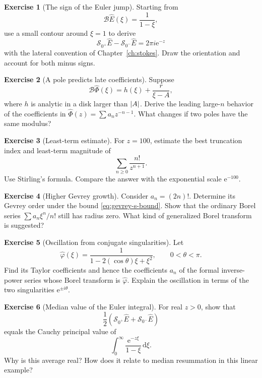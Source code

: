 \documentclass[11pt,oneside]{book}
\theoremstyle{definition}
\newtheorem{exercise}{Exercise}[chapter]
\theoremstyle{remark}
\newcommand{\Borel}{\mathcal{B}}
\newcommand{\e}{\mathrm{e}}
\newcommand{\dd}{\,\mathrm{d}}
\newcommand{\phihat}{\widehat{\Phi}}
\DeclarePairedDelimiter{\abs}{\lvert}{\rvert}
\begin{document}
\begin{exercise}[The sign of the Euler jump]
\label{ex:euler-jump}
Starting from
\[
  \Borel\widehat E(\xi)=\frac1{1-\xi},
\]
use a small contour around $\xi=1$ to derive
\[
  \mathcal S_{0^+}\widehat E-
  \mathcal S_{0^-}\widehat E=2\pi i\e^{-z}
\]
with the lateral convention of Chapter~\ref{ch:stokes}. Draw the orientation and
account for both minus signs.
\end{exercise}

\begin{exercise}[A pole predicts late coefficients]
\label{ex:pole-late-coefficients}
Suppose
\[
  \Borel\phihat(\xi)=h(\xi)+\frac{r}{\xi-A},
\]
where $h$ is analytic in a disk larger than $\abs A$. Derive the leading
large-$n$ behavior of the coefficients in
$\phihat(z)=\sum a_nz^{-n-1}$. What changes if two poles have the same modulus?
\end{exercise}

\begin{exercise}[Least-term estimate]
\label{ex:least-term}
For $z=100$, estimate the best truncation index and least-term magnitude of
\[
  \sum_{n\ge0}\frac{n!}{z^{n+1}}.
\]
Use Stirling's formula. Compare the answer with the exponential scale $\e^{-100}$.
\end{exercise}

\begin{exercise}[Higher Gevrey growth]
\label{ex:higher-gevrey}
Consider $a_n=(2n)!$. Determine its Gevrey order under
the bound \eqref{eq:gevrey-s-bound}. Show that the ordinary Borel series
$\sum a_n\xi^n/n!$ still has radius zero. What kind of generalized Borel
transform is suggested?
\end{exercise}

\begin{exercise}[Oscillation from conjugate singularities]
\label{ex:conjugate-singularities}
Let
\[
  \widehat\varphi(\xi)
  =\frac1{1-2(\cos\theta)\xi+\xi^2},
  \qquad0<\theta<\pi.
\]
Find its Taylor coefficients and hence the coefficients $a_n$ of the formal
inverse-power series whose Borel transform is $\widehat\varphi$. Explain the
oscillation in terms of the two singularities $\e^{\pm i\theta}$.
\end{exercise}

\begin{exercise}[Median value of the Euler integral]
\label{ex:euler-median}
For real $z>0$, show that
\[
  \frac12\left(
    \mathcal S_{0^+}\widehat E+
    \mathcal S_{0^-}\widehat E
  \right)
\]
equals the Cauchy principal value of
\[
  \int_0^\infty\frac{\e^{-z\xi}}{1-\xi}\dd\xi.
\]
Why is this average real? How does it relate to median resummation in this linear
example?
\end{exercise}
\end{document}
